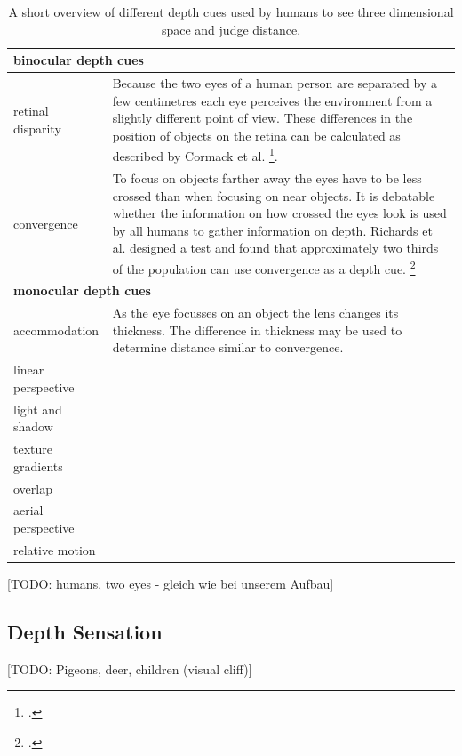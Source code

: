 \begin{table}[h!]
	\begin{tabularx}{\textwidth}{|l|X|}
		\hline
		\multicolumn{2}{|l|}{\textbf{binocular depth cues}} \\
		\hline
		retinal disparity & Because the two eyes of a human person are separated by a few centimetres each eye perceives the environment from a slightly different point of view. These differences in the position of objects on the retina can be calculated as described by Cormack et al. \footcite{Cormack_The_computation_of_retinal_disparity}.\\
		\hline
		convergence & To focus on objects farther away the eyes have to be less crossed than when focusing on near objects. It is debatable whether the information on how crossed the eyes look is used by all humans to gather information on depth. Richards et al. designed a test and found that approximately two thirds of the population can use convergence as a depth cue. \footcite{Richards_Convergence_as_a_cue_to_depth} \\
		\hline
		\multicolumn{2}{|l|}{\textbf{monocular depth cues}} \\
		\hline
		accommodation & As the eye focusses on an object the lens changes its thickness. The difference in thickness may be used to determine distance similar to convergence.\\
		\hline
		linear perspective & \\
		\hline
		light and shadow & \\
		\hline
		texture gradients & \\
		\hline
		overlap & \\
		\hline
		aerial perspective & \\
		\hline
		relative motion & \\
		\hline
	\end{tabularx}
	\label{tab:study_of_literature_depth_cues}
	\caption{A short overview of different depth cues used by humans to see three dimensional space and judge distance.}
\end{table}

[TODO: humans, two eyes - gleich wie bei unserem Aufbau]

\subsection{Depth Sensation}
[TODO: Pigeons, deer, children (visual cliff)]


\filbreak